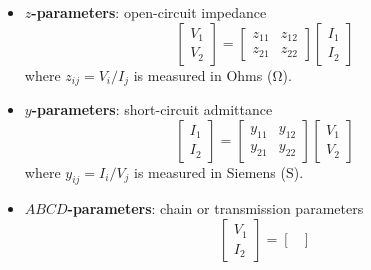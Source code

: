 \documentclass{article}
\begin{document}
\begin{itemize}
    \item \textbf{\(z\)-parameters}: open-circuit impedance
          \begin{equation*}
              \begin{bmatrix}
                  V_1 \\
                  V_2
              \end{bmatrix}
              =
              \begin{bmatrix}
                  z_{11} & z_{12} \\
                  z_{21} & z_{22}
              \end{bmatrix}
              \begin{bmatrix}
                  I_1 \\
                  I_2
              \end{bmatrix}
          \end{equation*}
          where \(z_{ij} = V_i / I_j\) is measured in Ohms (\(\unit{\ohm}\)).
    \item \textbf{\(y\)-parameters}: short-circuit admittance
          \begin{equation*}
              \begin{bmatrix}
                  I_1 \\
                  I_2
              \end{bmatrix}
              =
              \begin{bmatrix}
                  y_{11} & y_{12} \\
                  y_{21} & y_{22}
              \end{bmatrix}
              \begin{bmatrix}
                  V_1 \\
                  V_2
              \end{bmatrix}
          \end{equation*}
          where \(y_{ij} = I_i / V_j\) is measured in Siemens (\(\unit{\siemens}\)).
    \item \textbf{\(ABCD\)-parameters}: chain or transmission parameters
          \begin{equation*}
              \begin{bmatrix}
                  V_1 \\
                  I_2
              \end{bmatrix}
              =
              \begin{bmatrix}

\end{bmatrix}
\end{equation*}
\end{itemize}
\end{document}
